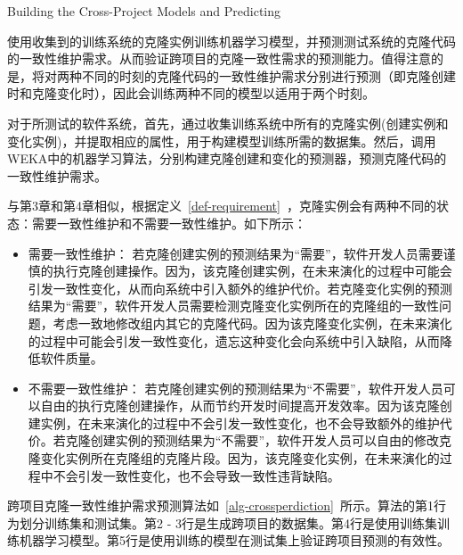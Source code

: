 
{Building the Cross-Project Models and Predicting}

使用收集到的训练系统的克隆实例训练机器学习模型，并预测测试系统的克隆代码的一致性维护需求。从而验证跨项目的克隆一致性需求的预测能力。值得注意的是，将对两种不同的时刻的克隆代码的一致性维护需求分别进行预测（即克隆创建时和克隆变化时），因此会训练两种不同的模型以适用于两个时刻。

对于所测试的软件系统，首先，通过收集训练系统中所有的克隆实例(创建实例和变化实例)，并提取相应的属性，用于构建模型训练所需的数据集。然后，调用WEKA中的机器学习算法，分别构建克隆创建和变化的预测器，预测克隆代码的一致性维护需求。

与第3章和第4章相似，根据定义~\ref{def-requirement}~，克隆实例会有两种不同的状态：需要一致性维护和不需要一致性维护。如下所示：

\begin{itemize}
\item 
需要一致性维护：
若克隆创建实例的预测结果为“需要”，软件开发人员需要谨慎的执行克隆创建操作。因为，该克隆创建实例，在未来演化的过程中可能会引发一致性变化，从而向系统中引入额外的维护代价。若克隆变化实例的预测结果为“需要”，软件开发人员需要检测克隆变化实例所在的克隆组的一致性问题，考虑一致地修改组内其它的克隆代码。因为该克隆变化实例，在未来演化的过程中可能会引发一致性变化，遗忘这种变化会向系统中引入缺陷，从而降低软件质量。
\item
不需要一致性维护：
若克隆创建实例的预测结果为“不需要”，软件开发人员可以自由的执行克隆创建操作，从而节约开发时间提高开发效率。因为该克隆创建实例，在未来演化的过程中不会引发一致性变化，也不会导致额外的维护代价。若克隆创建实例的预测结果为“不需要”，软件开发人员可以自由的修改克隆变化实例所在克隆组的克隆片段。因为，该克隆变化实例，在未来演化的过程中不会引发一致性变化，也不会导致一致性违背缺陷。
\end{itemize}

跨项目克隆一致性维护需求预测算法如~\ref{alg-crossperdiction}~所示。算法的第1行为划分训练集和测试集。第2 - 3行是生成跨项目的数据集。第4行是使用训练集训练机器学习模型。第5行是使用训练的模型在测试集上验证跨项目预测的有效性。

